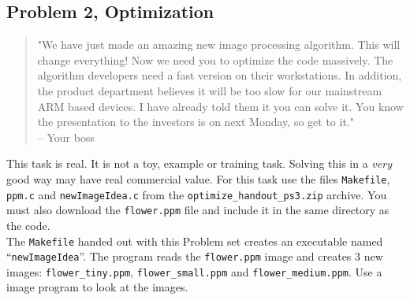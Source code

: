 \documentclass[10pt,a4paper]{article}
\begin{document}
\subsection*{Problem 2, Optimization}

\begin{quotation}
"We have just made an amazing new image processing algorithm. This will change everything! Now we need you to optimize the code massively. The algorithm developers need a fast version on their workstations. In addition, the product department believes it will be too slow for our mainstream ARM based devices. I have already told them it you can solve it. You know the presentation to the investors is on next Monday, so get to it." \\-- Your boss
\end{quotation}
This task is real. It is not a toy, example or training task. Solving this in a \emph{very} good way may have real commercial value. For this task use the files \texttt{Makefile}, \texttt{ppm.c} and \texttt{newImageIdea.c} from the \texttt{optimize\_handout\_ps3.zip} archive. You must also download the \texttt{flower.ppm} file and include it in the same directory as the code.\\

The \texttt{Makefile}  handed out with this Problem set creates an executable named ``\texttt{newImageIdea}''. The program reads the \texttt{flower.ppm} image and creates 3 new images: \texttt{flower\_tiny.ppm}, \texttt{flower\_small.ppm} and \texttt{flower\_medium.ppm}. Use a image program to look at the images. 
\end{document}
